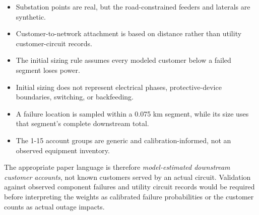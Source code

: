 \documentclass[11pt]{article}
\begin{document}
\enlargethispage{1.2\baselineskip}
\begin{itemize}[leftmargin=1.35em,itemsep=0.02em,topsep=0.1em,parsep=0pt]
  \item Substation points are real, but the road-constrained feeders and laterals are synthetic.
  \item Customer-to-network attachment is based on distance rather than utility customer-circuit records.
  \item The initial sizing rule assumes every modeled customer below a failed segment loses power.
  \item Initial sizing does not represent electrical phases, protective-device boundaries, switching, or backfeeding.
  \item A failure location is sampled within a 0.075 km segment, while its size uses that segment's complete downstream total.
  \item The 1-15 account groups are generic and calibration-informed, not an observed equipment inventory.
\end{itemize}

The appropriate paper language is therefore \emph{model-estimated downstream customer accounts}, not known customers served by an actual circuit. Validation against observed component failures and utility circuit records would be required before interpreting the weights as calibrated failure probabilities or the customer counts as actual outage impacts.



\end{document}
